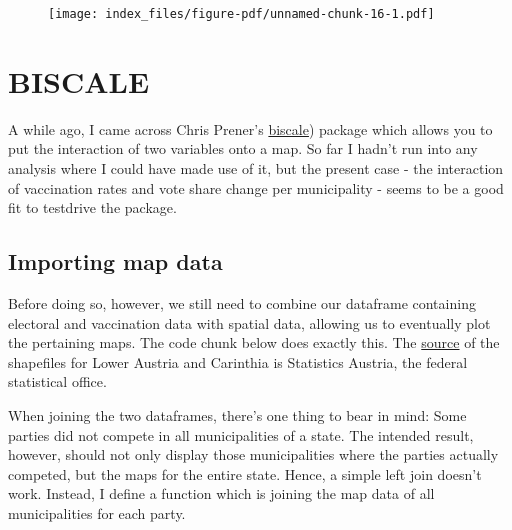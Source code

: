 \documentclass[
  letterpaper,
  DIV=11,
  numbers=noendperiod,
  oneside]{scrartcl}
\begin{document}
\begin{figure}[H]

\texttt{[image: index\_files/figure-pdf/unnamed-chunk-16-1.pdf]} \hfill{}

\end{figure}

\hypertarget{biscale}{%
\section{BISCALE}\label{biscale}}

A while ago, I came across Chris Prener's
\href{https://chris-prener.github.io/biscale/}{biscale}) package which
allows you to put the interaction of two variables onto a map. So far I
hadn't run into any analysis where I could have made use of it, but the
present case - the interaction of vaccination rates and vote share
change per municipality - seems to be a good fit to testdrive the
package.

\hypertarget{importing-map-data}{%
\subsection{Importing map data}\label{importing-map-data}}

Before doing so, however, we still need to combine our dataframe
containing electoral and vaccination data with spatial data, allowing us
to eventually plot the pertaining maps. The code chunk below does
exactly this. The
\href{https://www.data.gv.at/katalog/dataset/stat_gliederung-osterreichs-in-gemeinden14f53}{source}
of the shapefiles for Lower Austria and Carinthia is Statistics Austria,
the federal statistical office.

When joining the two dataframes, there's one thing to bear in mind: Some
parties did not compete in all municipalities of a state. The intended
result, however, should not only display those municipalities where the
parties actually competed, but the maps for the entire state. Hence, a
simple left join doesn't work. Instead, I define a function which is
joining the map data of all municipalities for each party.
\end{document}
